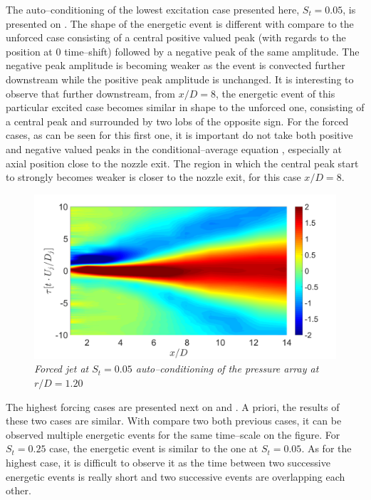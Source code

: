 The auto--conditioning of the lowest excitation case presented here, $S_t = 0.05$, is presented on . The shape of the energetic event is different with compare to the unforced case consisting of a central positive valued peak (with regards to the position at $0$ time--shift) followed by a negative peak of the same amplitude. The negative peak amplitude is becoming weaker as the event is convected further downstream while the positive peak amplitude is unchanged. It is interesting to observe that further downstream, from $x/D=8$, the energetic event of this particular excited case becomes similar in shape to the unforced one, consisting of a central peak and surrounded by two lobs of the opposite sign. For the forced cases, as can be seen for this first one, it is important do not take both positive and negative valued peaks in the conditional--average equation , especially at axial position close to the nozzle exit. The region in which the central peak start to strongly becomes weaker is closer to the nozzle exit, for this case $x/D = 8$. 

\begin{figure}
	\centering
	\includegraphics[width=1\textwidth]{Figures/conditioning/autoCondSt0p05.png}
	\caption{\textit{Forced jet at $S_t = 0.05$ auto--conditioning of the pressure array at $r/D = 1.20$}}
	\label{fig:autoCondSt0p05}
\end{figure}

The highest forcing cases are presented next on  and .  A priori, the results of these two cases are similar. With compare two both previous cases, it can be observed multiple energetic events for the same time--scale on the figure. For $S_t = 0.25$ case, the energetic event is similar to the one at $S_t = 0.05$. As for the highest case, it is difficult to observe it as the time between two successive energetic events is really short and two successive events are overlapping each other. 


